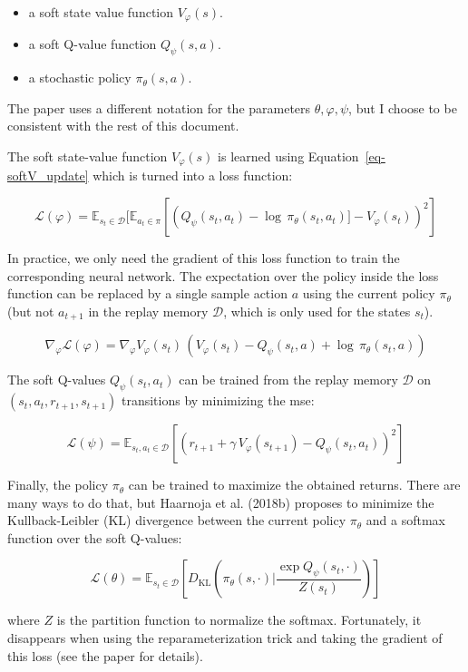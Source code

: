 \documentclass[
  letterpaper,
  DIV=11,
  numbers=noendperiod]{scrreprt}
\providecommand{\tightlist}{%
  \setlength{\itemsep}{0pt}\setlength{\parskip}{0pt}}\usepackage{longtable,booktabs,array}
\begin{document}
\begin{itemize}
\tightlist
\item
  a soft state value function \(V_\varphi(s)\).
\item
  a soft Q-value function \(Q_\psi(s,a)\).
\item
  a stochastic policy \(\pi_\theta(s, a)\).
\end{itemize}

The paper uses a different notation for the parameters
\(\theta, \varphi, \psi\), but I choose to be consistent with the rest
of this document.

The soft state-value function \(V_\varphi(s)\) is learned using
Equation~\ref{eq-softV_update} which is turned into a loss function:

\[
    \mathcal{L}(\varphi) = \mathbb{E}_{s_t \in \mathcal{D}} [\mathbb{E}_{a_{t} \in \pi} [(Q_\psi(s_{t}, a_{t}) - \log \, \pi_\theta(s_t, a_t)] - V_\varphi(s_t) )^2]
\]

In practice, we only need the gradient of this loss function to train
the corresponding neural network. The expectation over the policy inside
the loss function can be replaced by a single sample action \(a\) using
the current policy \(\pi_\theta\) (but not \(a_{t+1}\) in the replay
memory \(\mathcal{D}\), which is only used for the states \(s_t\)).

\[
    \nabla_\varphi \mathcal{L}(\varphi) = \nabla_\varphi V_\varphi(s_t) \, (V_\varphi(s_t) - Q_\psi(s_{t}, a) + \log \, \pi_\theta(s_t, a) )
\]

The soft Q-values \(Q_\psi(s_{t}, a_{t})\) can be trained from the
replay memory \(\mathcal{D}\) on \((s_t, a_t, r_{t+1} , s_{t+1})\)
transitions by minimizing the mse:

\[
    \mathcal{L}(\psi) = \mathbb{E}_{s_t, a_t \in \mathcal{D}} [(r_{t+1} + \gamma \, V_\varphi(s_{t+1}) - Q_\psi(s_t, a_t))^2]
\]

Finally, the policy \(\pi_\theta\) can be trained to maximize the
obtained returns. There are many ways to do that, but Haarnoja et al.
(2018b) proposes to minimize the Kullback-Leibler (KL) divergence
between the current policy \(\pi_\theta\) and a softmax function over
the soft Q-values:

\[
    \mathcal{L}(\theta) = \mathbb{E}_{s_t \in \mathcal{D}} [D_\text{KL}(\pi_\theta(s, \cdot) | \frac{\exp Q_\psi(s_t, \cdot)}{Z(s_t)})]
\]

where \(Z\) is the partition function to normalize the softmax.
Fortunately, it disappears when using the reparameterization trick and
taking the gradient of this loss (see the paper for details).
\end{document}
